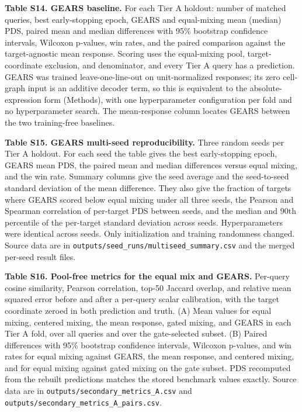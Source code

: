 \documentclass[12pt]{article}
\begin{document}
\begin{singlespace}
\noindent\textbf{Table S14. GEARS baseline.} For each Tier A holdout: number of matched queries, best early-stopping epoch, GEARS and equal-mixing mean (median) PDS, paired mean and median differences with 95\% bootstrap confidence intervals, Wilcoxon p-values, win rates, and the paired comparison against the target-agnostic mean response. Scoring uses the equal-mixing pool, target-coordinate exclusion, and denominator, and every Tier A query has a prediction. GEARS was trained leave-one-line-out on unit-normalized responses; its zero cell-graph input is an additive decoder term, so this is equivalent to the absolute-expression form (Methods), with one hyperparameter configuration per fold and no hyperparameter search. The mean-response column locates GEARS between the two training-free baselines.

\noindent\textbf{Table S15. GEARS multi-seed reproducibility.} Three random seeds per Tier A holdout. For each seed the table gives the best early-stopping epoch, GEARS mean PDS, the paired mean and median differences versus equal mixing, and the win rate. Summary columns give the seed average and the seed-to-seed standard deviation of the mean difference. They also give the fraction of targets where GEARS scored below equal mixing under all three seeds, the Pearson and Spearman correlation of per-target PDS between seeds, and the median and 90th percentile of the per-target standard deviation across seeds. Hyperparameters were identical across seeds. Only initialization and training randomness changed. Source data are in \texttt{outputs/seed\_runs/multiseed\_summary.csv} and the merged per-seed result files.

\noindent\textbf{Table S16. Pool-free metrics for the equal mix and GEARS.} Per-query cosine similarity, Pearson correlation, top-50 Jaccard overlap, and relative mean squared error before and after a per-query scalar calibration, with the target coordinate zeroed in both prediction and truth. (A) Mean values for equal mixing, centered mixing, the mean response, gated mixing, and GEARS in each Tier A fold, over all queries and over the gate-selected subset. (B) Paired differences with 95\% bootstrap confidence intervals, Wilcoxon p-values, and win rates for equal mixing against GEARS, the mean response, and centered mixing, and for equal mixing against gated mixing on the gate subset. PDS recomputed from the rebuilt predictions matches the stored benchmark values exactly. Source data are in \texttt{outputs/secondary\_metrics\_A.csv} and \texttt{outputs/secondary\_metrics\_A\_pairs.csv}.


\end{singlespace}
\end{document}

